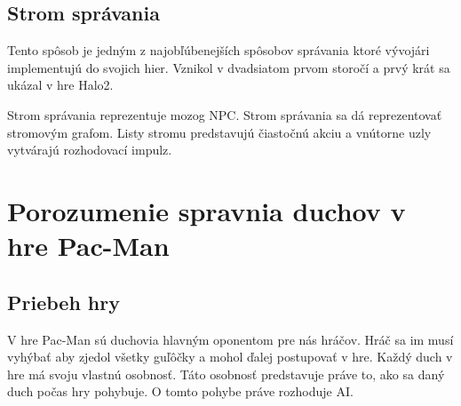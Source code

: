 \documentclass[10pt,oneside,slovak,a4paper]{article}
\begin{document}
\subsection{Strom správania} \label{BT}

Tento spôsob je jedným z najobľúbenejších spôsobov správania ktoré vývojári implementujú do svojich hier.  Vznikol v dvadsiatom prvom storočí a prvý krát sa ukázal v hre Halo2.

 Strom správania reprezentuje mozog NPC. 
Strom správania sa dá reprezentovať stromovým grafom. Listy stromu predstavujú  čiastočnú akciu a vnútorne uzly vytvárajú rozhodovací impulz.~\cite{1.zdroj}


\section{Porozumenie spravnia duchov v hre Pac-Man}\label{Pac-Man}

\subsection{Priebeh hry}\label{ph}



V hre Pac-Man sú duchovia hlavným oponentom pre nás hráčov. Hráč sa im musí vyhýbať aby zjedol všetky guľôčky a mohol ďalej postupovať v hre. Každý duch v hre má svoju vlastnú osobnosť. Táto osobnosť predstavuje práve to, ako sa daný duch počas hry pohybuje. O tomto pohybe práve rozhoduje AI.
\end{document}
